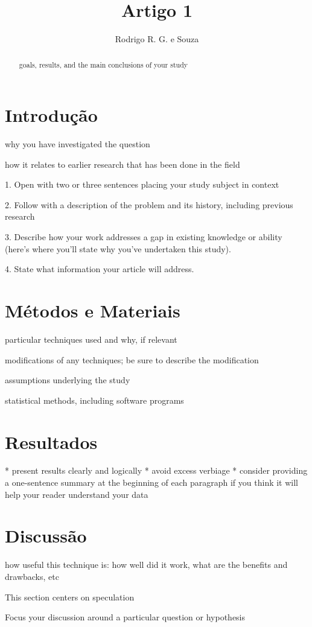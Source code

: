 \documentclass{article}
\begin{document}
\title{Artigo 1}
\author{Rodrigo R. G. e Souza}
\maketitle


\begin{abstract}

goals, results, and the main conclusions of your study

\end{abstract}

\section{Introdução} %

why you have investigated the question

how it relates to earlier research that has been done in the field

1. Open with two or three sentences placing your study subject in context

2. Follow with a description of the problem and its history, including previous research

3. Describe how your work addresses a gap in existing knowledge or ability (here's where you'll state why you've undertaken this study). 

4. State what information your article will address. 

\section{Métodos e Materiais} %

particular techniques used and why, if relevant

modifications of any techniques; be sure to describe the modification

assumptions underlying the study 

statistical methods, including software programs 

\section{Resultados} %

  * present results clearly and logically
  * avoid excess verbiage
  * consider providing a one-sentence summary at the beginning of each paragraph if you think it will help your reader understand your data 

\section{Discussão} %

how useful this technique is: how well did it work, what are the benefits and drawbacks, etc

This section centers on speculation

Focus your discussion around a particular question or hypothesis



\end{document}
